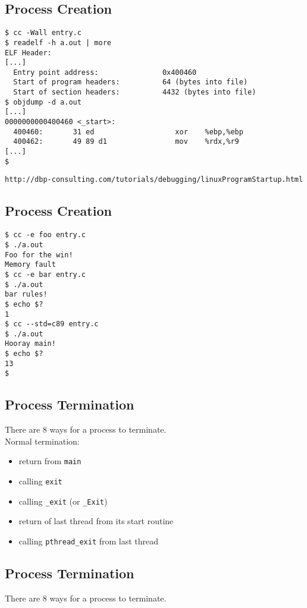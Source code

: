 \documentclass[xga]{xdvislides}
\begin{document}
\subsection{Process Creation}
\begin{verbatim}
$ cc -Wall entry.c
$ readelf -h a.out | more
ELF Header:
[...]
  Entry point address:               0x400460
  Start of program headers:          64 (bytes into file)
  Start of section headers:          4432 (bytes into file)
$ objdump -d a.out
[...]
0000000000400460 <_start>:
  400460:       31 ed                   xor    %ebp,%ebp
  400462:       49 89 d1                mov    %rdx,%r9
[...]
$
\end{verbatim}

\verb+http://dbp-consulting.com/tutorials/debugging/linuxProgramStartup.html+



\subsection{Process Creation}
\begin{verbatim}
$ cc -e foo entry.c
$ ./a.out
Foo for the win!
Memory fault
$ cc -e bar entry.c
$ ./a.out
bar rules!
$ echo $?
1
$ cc --std=c89 entry.c
$ ./a.out
Hooray main!
$ echo $?
13
$
\end{verbatim}

\subsection{Process Termination}
There are 8 ways for a process to terminate.
\\

Normal termination:
\begin{itemize}
	\item return from {\tt main}
	\item calling {\tt exit}
	\item calling {\tt \_exit} (or {\tt\_Exit})
	\item return of last thread from its start routine
	\item calling {\tt pthread\_exit} from last thread
\end{itemize}
\vspace{.25in}

\subsection{Process Termination}
There are 8 ways for a process to terminate.
\\
\end{document}
